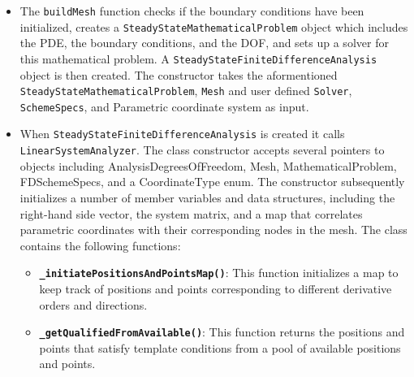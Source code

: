 \documentclass{article}
\begin{document}
\begin{itemize}
 			\item The \texttt{buildMesh} function checks if the boundary conditions have been initialized, creates a \texttt{SteadyStateMathematicalProblem} object which includes the PDE, the boundary conditions, and the DOF, and sets up a solver for this mathematical problem. \newline A \texttt{SteadyStateFiniteDifferenceAnalysis} object is then created. The constructor takes the aformentioned \texttt{SteadyStateMathematicalProblem}, \texttt{Mesh} and user defined \texttt{Solver}, \texttt{SchemeSpecs}, and Parametric coordinate system as input.
 			
 			\item When \texttt{SteadyStateFiniteDifferenceAnalysis} is created it calls \texttt{LinearSystemAnalyzer}.
 			The class constructor accepts several pointers to objects including AnalysisDegreesOfFreedom, Mesh, MathematicalProblem, FDSchemeSpecs, and a CoordinateType enum. The constructor subsequently initializes a number of member variables and data structures, including the right-hand side vector, the system matrix, and a map that correlates parametric coordinates with their corresponding nodes in the mesh. The class contains the following functions:
 			\begin{itemize}
	 			\item \textbf{\texttt{\_initiatePositionsAndPointsMap()}}: This function initializes a map to keep track of positions and points corresponding to different derivative orders and directions.
 				
 				\item \textbf{\texttt{\_getQualifiedFromAvailable()}}: This function returns the positions and points that satisfy template conditions from a pool of available positions and points.
 				

\end{itemize}
\end{itemize}
\end{document}
